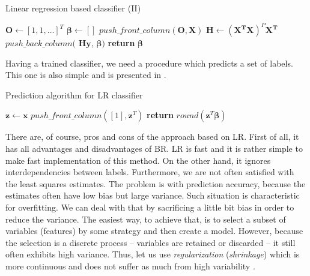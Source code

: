 \begin{algorithm}
    \caption{Linear regression based classifier (II)}\label{alg:LR1}
    \begin{algorithmic}[1]
        \State $\boldsymbol{O} \gets [1, 1, \ldots]^T$ 
        \State $\boldsymbol{\beta} \gets []$
        \State $push\_front\_column(\boldsymbol{O}, \boldsymbol{X})$
        \State $\boldsymbol{H} \gets (\boldsymbol{X^T}\boldsymbol{X})^P\boldsymbol{X^T}$
            \State $push\_back\_column($ $\boldsymbol{H}\boldsymbol{y}$, $\boldsymbol{\beta})$ 
        \EndFor
        \State \textbf{return} $\boldsymbol{\beta}$
    \EndFunction
    \end{algorithmic}
\end{algorithm}


Having a trained classifier, we need a procedure which predicts a set of labels. This one is also simple and is presented in .

\begin{algorithm}
    \caption{Prediction algorithm for LR classifier}\label{alg:CL1}
    \begin{algorithmic}[1]
        \State $\boldsymbol{z} \gets \boldsymbol{x}$ 
        \State $push\_front\_column([1], \boldsymbol{z}^T)$ 
        \State \textbf{return} $round(\boldsymbol{z}^T\boldsymbol{\beta})$
    \EndFunction
    \end{algorithmic}
\end{algorithm}

There are, of course, pros and cons of the approach based on LR. First of all, it has all advantages and disadvantages of BR. LR is fast and it is rather simple to make fast implementation of this method. On the other hand, it ignores interdependencies between labels. Furthermore, we are not often satisfied with the least squares estimates. The problem is with prediction accuracy, because the estimates often have low bias but large variance. Such situation is characteristic for overfitting. We can deal with that by sacrificing a little bit bias in order to reduce the variance. The easiest way, to achieve that, is to select a subset of variables (features) by some strategy and then create a model. However, because the selection is a discrete process -- variables are retained or discarded -- it still often exhibits high variance. Thus, let us use \textit{regularization} (\textit{shrinkage}) which is more continuous and does not suffer as much from high variability \citep{Trevor}.


